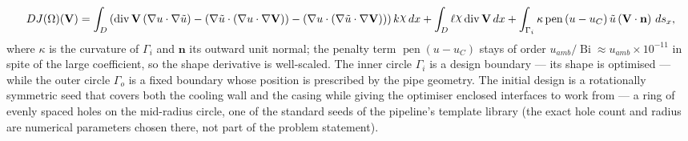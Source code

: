 \documentclass[preview]{standalone}
\let\oldcdot\cdot
\let\cdot\oldcdot
\begin{document}
\begin{dmath*}
DJ(\Omega)(\mathbf V) = \int_{D} \left(\operatorname{div} {\mathbf V} \left(  \nabla u  \cdot  \nabla \tilde u  \right) - \left(  \nabla \tilde u  \cdot \left(  \nabla u  \cdot  \nabla {\mathbf V}  \right) \right) - \left(  \nabla u  \cdot \left(  \nabla \tilde u  \cdot  \nabla {\mathbf V}  \right) \right)\right) k \raisebox{\depth}{$\chi$} \,dx + \int_{D} \ell \raisebox{\depth}{$\chi$} \operatorname{div} {\mathbf V} \,dx + \int_{\Gamma_i} \kappa \operatorname{pen} \left( u - u_{C}\right) \tilde u \left(\mathbf V \cdot \mathbf n\right) \,ds_x ,
\end{dmath*}
where $\kappa$ is the curvature of $\Gamma_i$ and $\mathbf n$ its outward unit normal; the penalty term $\operatorname{pen}\left(u - u_C\right)$ stays of order $u_{amb} / \operatorname{Bi} \approx u_{amb} \times 10^{-11}$ in spite of the large coefficient, so the shape derivative is well-scaled.  The inner circle $\Gamma_i$ is a design boundary — its shape is optimised — while the outer circle $\Gamma_o$ is a fixed boundary whose position is prescribed by the pipe geometry.
The initial design is a rotationally symmetric seed that covers both the cooling wall and the casing while giving the optimiser enclosed interfaces to work from — a ring of evenly spaced holes on the mid-radius circle, one of the standard seeds of the pipeline's template library (the exact hole count and radius are numerical parameters chosen there, not part of the problem statement).
\end{document}
